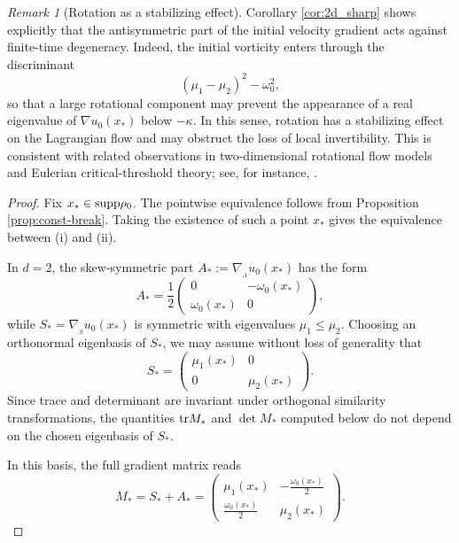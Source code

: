 \documentclass[11pt]{amsart}
\numberwithin{equation}{section}
\theoremstyle{definition}
\theoremstyle{remark}
\newtheorem{remark}[theorem]{Remark}
\numberwithin{equation}{section}
\newtheorem{remark}[theorem]{Remark}
\newcommand{\supp}{{\rm supp}}
\newcommand{\tr}{{\rm tr}}
\newcommand{\nabS}{\nabla_{\!\!{}_S}}
\newcommand{\nabA}{\nabla_{\!\!{}_A}}
\renewcommand{\le}{\leqslant}
\begin{document}
\begin{remark}[Rotation as a stabilizing effect] Corollary \ref{cor:2d_sharp} shows explicitly that the antisymmetric part of the initial velocity gradient acts against finite-time degeneracy. Indeed, the initial vorticity enters through the discriminant
\[
(\mu_1-\mu_2)^2-\omega_0^2,
\]
so that a large rotational component may prevent the appearance of a real eigenvalue of $\nabla u_0(x_*)$ below $-\kappa$. In this sense, rotation has a stabilizing effect on the Lagrangian flow and may obstruct the loss of local invertibility. This is consistent with related observations in two-dimensional rotational flow models and Eulerian critical-threshold theory; see, for instance, \cite{HT17,LT04,Tad23}.
\end{remark}
\begin{proof}  Fix $x_*\in\supp\rho_0$. The pointwise equivalence follows from Proposition \ref{prop:const-break}. Taking the existence of such a point $x_*$ gives the equivalence between {\rm(i)} and {\rm(ii)}.

In $d=2$, the skew-symmetric part $A_*:=\nabA u_0(x_*)$ has the form
\[
A_*= \frac12\begin{pmatrix}0&-\omega_0(x_*)\\ \omega_0(x_*)&0\end{pmatrix},  
\]
while $S_*=\nabS u_0(x_*)$ is symmetric with eigenvalues $\mu_1\le\mu_2$. Choosing an orthonormal eigenbasis of $S_*$, we may assume without loss of generality that
\[
S_*=\begin{pmatrix}\mu_1(x_*) & 0 \\ 0 & \mu_2(x_*) \end{pmatrix}.
\]
Since trace and determinant are invariant under orthogonal similarity transformations, the quantities $\tr M_*$ and $\det M_*$ computed below do not depend on the chosen eigenbasis of $S_*$.

In this basis, the full gradient matrix reads
\[
M_*=S_*+A_*= \begin{pmatrix}
\mu_1(x_*) & - \frac{\omega_0(x_*)}2\\
\frac{\omega_0(x_*)}2 & \mu_2(x_*)
\end{pmatrix}.
\]


\end{proof}
\end{document}
